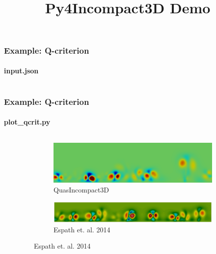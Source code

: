\documentclass{beamer}
\title{Py4Incompact3D Demo}
\begin{document}
\maketitle

\begin{frame}
  \frametitle{Example: Q-criterion}
  \framesubtitle{input.json}

  \begin{columns}
    \begin{column}{0.49\textwidth}
      
    \end{column}
    \begin{column}{0.49\textwidth}
      
      
    \end{column}
  \end{columns}
\end{frame}
\begin{frame}
  \frametitle{Example: Q-criterion}
  \framesubtitle{plot\_qcrit.py}


  \begin{columns}
    \begin{column}{0.49\textwidth}
      
    \end{column}
    \begin{column}{0.49\textwidth}
      \begin{figure}[h!]
        \centering
        \begin{subfigure}[b]{0.99\textwidth}
          \includegraphics[width=\textwidth]{g0998-q-t8}
          \caption{QuasIncompact3D}
        \end{subfigure}
        \begin{subfigure}[b]{0.99\textwidth}
          \includegraphics[width=\textwidth]{boussinesq-q-t8}
          \caption{Espath et. al. 2014}
        \end{subfigure}
      \end{figure}
    \end{column}
  \end{columns}
\end{frame}
\end{document}
